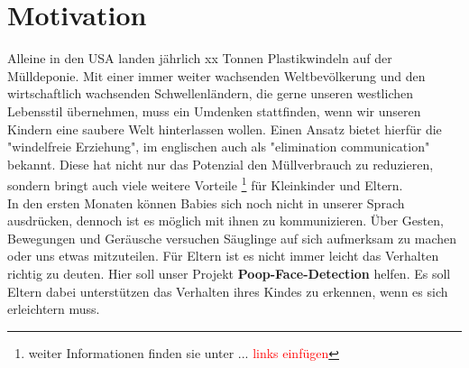 \section{Motivation}
\label{sec:Motivation}
Alleine in den USA landen jährlich xx Tonnen Plastikwindeln auf der Mülldeponie. Mit einer immer weiter wachsenden Weltbevölkerung und den wirtschaftlich wachsenden Schwellenländern, die gerne unseren westlichen Lebensstil übernehmen,
muss ein Umdenken stattfinden, wenn wir unseren Kindern eine saubere Welt hinterlassen wollen. Einen Ansatz bietet hierfür die "windelfreie Erziehung", im englischen auch als "elimination communication" bekannt. Diese hat nicht nur das Potenzial den Müllverbrauch zu reduzieren, sondern bringt auch viele weitere Vorteile \footnote{ weiter Informationen finden sie unter ... \textcolor{red}{links einfügen}} für Kleinkinder und Eltern. \\

In den ersten Monaten können Babies sich noch nicht in unserer Sprach ausdrücken, dennoch ist es möglich mit ihnen zu kommunizieren. Über Gesten, Bewegungen und Geräusche versuchen Säuglinge auf sich aufmerksam zu machen oder uns etwas mitzuteilen. Für Eltern ist es nicht immer leicht das Verhalten richtig zu deuten. Hier soll unser Projekt \textbf{Poop-Face-Detection} helfen. Es soll Eltern dabei unterstützen das Verhalten ihres Kindes zu erkennen, wenn es sich erleichtern muss.
